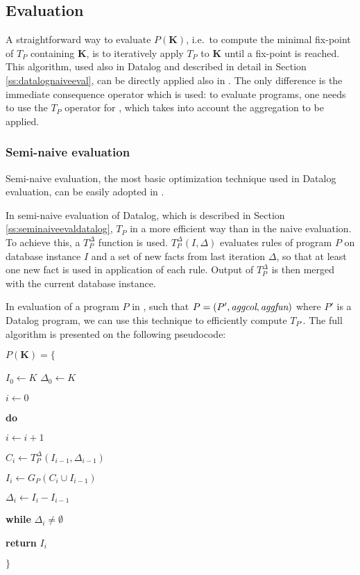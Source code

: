 \subsection{Evaluation}
A straightforward way to evaluate $P(\textbf{K})$, i.e.\ to compute the minimal fix-point of $T_P$ containing $\textbf{K}$, is to iteratively apply $T_P$ to $\textbf{K}$ until a fix-point is reached. This algorithm, used also in Datalog and described in detail in Section \ref{ss:datalognaiveeval}, can be directly applied also in \datalogra. The only difference is the immediate consequence operator which is used: to evaluate \datalogra programs, one needs to use the $T_P$ operator for \datalogra, which takes into account the aggregation to be applied.

\subsubsection{Semi-naive evaluation} Semi-naive evaluation, the most basic optimization technique used in Datalog evaluation, can be easily adopted in \datalogra.

In semi-naive evaluation of Datalog, which is described in Section \ref{ss:seminaiveevaldatalog}, $T_P$ in a more efficient way than in the naive evaluation. To achieve this, a $T^\Delta_P$ function is used. $T_P^\Delta(I, \Delta)$ evaluates rules of program $P$ on database instance $I$ and a set of new facts from last iteration $\Delta$, so that at least one new fact is used in application of each rule. Output of $T^\Delta_P$ is then merged with the current database instance.

In evaluation of a program $P$ in \datalogra, such that $P = (P', \textit{aggcol}, \textit{aggfun})$ where $P'$ is a Datalog program, we can use this technique to efficiently compute $T_{P'}$. The full algorithm is presented on the following pseudocode:


\parbox{0.5\textwidth}{
$P(\textbf{K}) = \{$

{\addtolength{\leftskip}{5mm}

$I_0 \leftarrow K$
$\Delta_0 \leftarrow K$

$i \leftarrow 0$

\textbf{do}

{\addtolength{\leftskip}{5mm}

$i \leftarrow i + 1$

$C_i \leftarrow T_P^\Delta(I_{i-1}, \Delta_{i-1})$

$I_i \leftarrow G_P(C_i \cup I_{i-1})$

$\Delta_i \leftarrow I_i - I_{i-1}$

}

\textbf{while} $\Delta_i \ne \emptyset$

\textbf{return} $I_i$

}

$\}$
}

